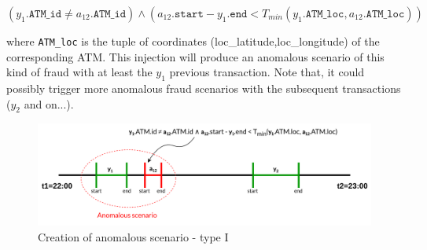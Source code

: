 \documentclass{article}
\begin{document}
$$(y_1.\texttt{ATM\_id} \ne a_{12}.\texttt{ATM\_id}) \land (a_{12}.\texttt{start} - 
y_1.\texttt{end} < T_{min}(y_1.\texttt{ATM\_loc}, a_{12}.\texttt{ATM\_loc}))$$

where \texttt{ATM\_loc} is the tuple of coordinates (loc\_latitude,loc\_longitude) of the corresponding ATM. This injection will produce an anomalous scenario of this kind of fraud with at least the $y_1$ previous transaction. Note that, it could possibly trigger more anomalous fraud scenarios with the subsequent transactions ($y_2$ and on...).

\begin{figure}[H]
    \centering
    \includegraphics[width=\textwidth]{images/tx-generation.png}
    \caption{Creation of anomalous scenario - type I}
    \label{img:anomalous-type-1}
\end{figure}
\end{document}
